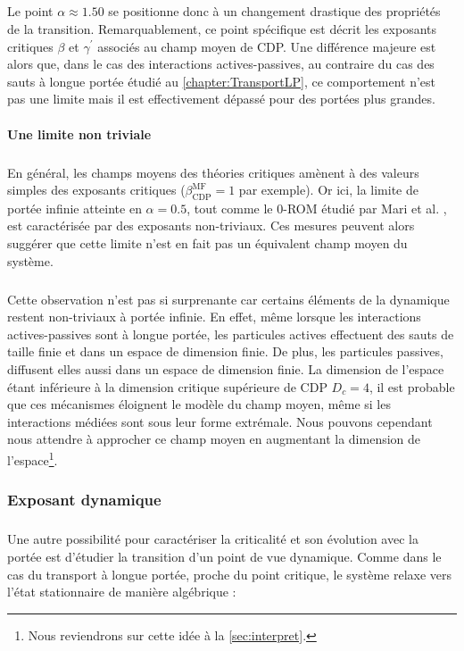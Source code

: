 \subparagraph{}Le point $\alpha\approx 1.50$ se positionne donc à un changement drastique des propriétés de la transition. Remarquablement, ce point spécifique est décrit les exposants critiques $\beta$ et $\gamma^\prime$ associés au champ moyen de CDP. Une différence majeure est alors que, dans le cas des interactions actives-passives, au contraire du cas des sauts à longue portée étudié au \autoref{chapter:TransportLP}, ce comportement n'est pas une limite mais il est effectivement dépassé pour des portées plus grandes.

\paragraph{Une limite non triviale}

\subparagraph{}En général, les champs moyens des théories critiques amènent à des valeurs simples des exposants critiques ($\beta_\text{CDP}^\text{MF}=1$ par exemple). Or ici, la limite de portée infinie atteinte en $\alpha=0.5$, tout comme le 0-ROM étudié par Mari et al. \cite{mari_absorbing_2022}, est caractérisée par des exposants non-triviaux. Ces mesures peuvent alors suggérer que cette limite n'est en fait pas un équivalent champ moyen du système. 

\subparagraph{}Cette observation n'est pas si surprenante car certains éléments de la dynamique restent non-triviaux à portée infinie. En effet, même lorsque les interactions actives-passives sont à longue portée, les particules actives effectuent des sauts de taille finie et dans un espace de dimension finie. De plus, les particules passives, diffusent elles aussi dans un espace de dimension finie. La dimension de l'espace étant inférieure à la dimension critique supérieure de CDP $D_c = 4$, il est probable que ces mécanismes éloignent le modèle du champ moyen, même si les interactions médiées sont sous leur forme extrémale. Nous pouvons cependant nous attendre à approcher ce champ moyen en augmentant la dimension de l'espace\footnote{Nous reviendrons sur cette idée à la \autoref{sec:interpret}.}.

\subsubsection{Exposant dynamique}

\label{sec:TBLRRdyn}

\subparagraph{}Une autre possibilité pour caractériser la criticalité et son évolution avec la portée est d'étudier la transition d'un point de vue dynamique. Comme dans le cas du transport à longue portée, proche du point critique, le système relaxe vers l'état stationnaire de manière algébrique :

